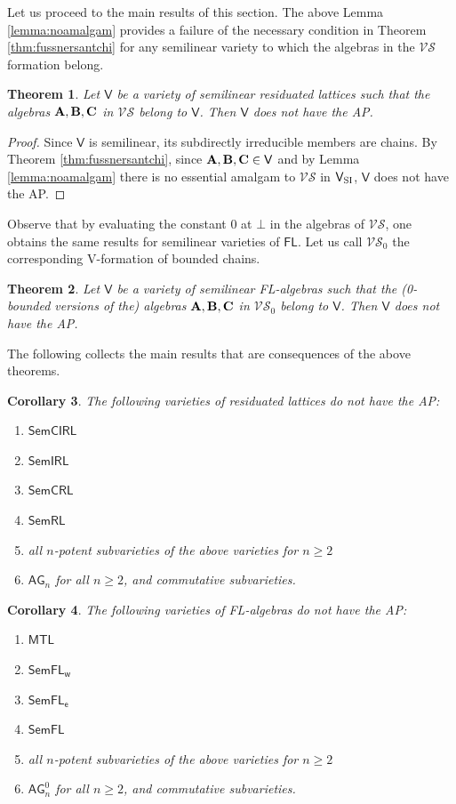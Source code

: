 \documentclass{amsart}
\newtheorem{theorem}{Theorem}[section]
\newtheorem{corollary}[theorem]{Corollary}
\theoremstyle{definition}
\numberwithin{equation}{section}
\newcommand{\alg}[1]{{\textbf{\upshape #1}}}  %
\newcommand{\vv}[1]{\mathsf {#1}}
\newcommand{\si}{{\rm SI}}
\newcommand{\VS}{\mathcal{VS}}
\newcommand{\BG}{\vv{AG}}
\begin{document}
Let us proceed to the main results of this section. The above Lemma \ref{lemma:noamalgam} provides a failure of the necessary condition in Theorem \ref{thm:fussnersantchi} for any semilinear variety to which the algebras in the $\VS$ formation belong.
\begin{theorem}\label{theorem:noAP}
	Let $\vv V$ be a variety of semilinear residuated lattices such that the algebras $\alg A, \alg B, \alg C$ in $\VS$ belong to $\vv V$. Then $\vv V$ does not have the AP. 
\end{theorem}
\begin{proof}
	Since $\vv V$ is semilinear, its subdirectly irreducible members are chains. By Theorem \ref{thm:fussnersantchi}, since $\alg A, \alg B, \alg C \in \vv V$ and by Lemma \ref{lemma:noamalgam} there is no essential amalgam to $\VS$ in $\vv V_{\si}$, $\vv V$ does not have the AP.
\end{proof}
Observe that by evaluating the constant $0$ at $\bot$ in the algebras of $\VS$, one obtains the same results for semilinear varieties of $\vv{FL}$. Let us call $\VS_0$ the corresponding V-formation of bounded chains.
\begin{theorem}\label{theorem:noAP0}
	Let $\vv V$ be a variety of semilinear FL-algebras such that the (0-bounded versions of the) algebras $\alg A, \alg B, \alg C$ in $\VS_0$ belong to $\vv V$. Then $\vv V$ does not have the AP. 
\end{theorem}
The following collects the main results that are consequences of the above theorems.
\begin{corollary}
	The following varieties of residuated lattices do not have the AP:
	\begin{enumerate}
	    \item $\mathsf{SemCIRL}$
	   \item $\mathsf{SemIRL}$
	   \item $\mathsf{SemCRL}$ \cite{FussnerSantschi24}
	   \item $\mathsf{SemRL}$ \cite{GilferezLeddaTsinakis2015}
	   \item all $n$-potent subvarieties of the above varieties for $n \geq 2$
	   \item  $\BG_{n}$ for all $n \geq 2$, and commutative subvarieties.
	\end{enumerate}
\end{corollary}
\begin{corollary}
	The following varieties of FL-algebras do not have the AP:
	\begin{enumerate}
	   \item $\mathsf{MTL}$
	   \item $\mathsf{SemFL_w}$
	   \item $\mathsf{SemFL_e}$ \cite{FussnerSantschi24}
	   \item $\mathsf{SemFL}$
	   \item all $n$-potent subvarieties of the above varieties for $n \geq 2$
	   \item $\BG_{n}^0$ for all $n \geq 2$, and commutative subvarieties.
	\end{enumerate}
\end{corollary}
\end{document}
